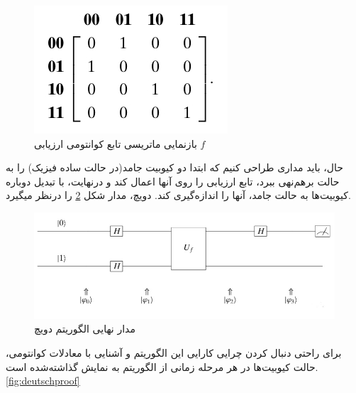 \begin{figure}[!h]
\centerline{\includegraphics[width=.4\textwidth]{deutschmatrix.jpeg}}
\caption{بازنمایی ماتریسی تابع کوانتومی ارزیابی $f$}
\label{fig:deutschmatrix}
\end{figure}
حال، باید مداری طراحی کنیم که ابتدا دو کیوبیت جامد(در حالت ساده فیزیک) را به حالت برهم‌نهی ببرد، تابع ارزیابی را روی آنها اعمال کند و درنهایت، با تبدیل دوباره کیوبیت‌ها به حالت جامد، آنها را اندازه‌گیری کند. دویچ، مدار شکل
\ref{fig:deutschcircuit}
 را درنظر میگیرد.
\begin{figure}[!h]
\centerline{\includegraphics[width=.8\textwidth]{deutschcircuit.jpeg}}
\caption{مدار نهایی الگوریتم دویچ}
\label{fig:deutschcircuit}
\end{figure}
برای راحتی دنبال کردن چرایی کارایی این الگوریتم و آشنایی با معادلات کوانتومی، حالت کیوبیت‌ها در هر مرحله زمانی از الگوریتم به نمایش گذاشته‌شده است.
\ref{fig:deutschproof}

